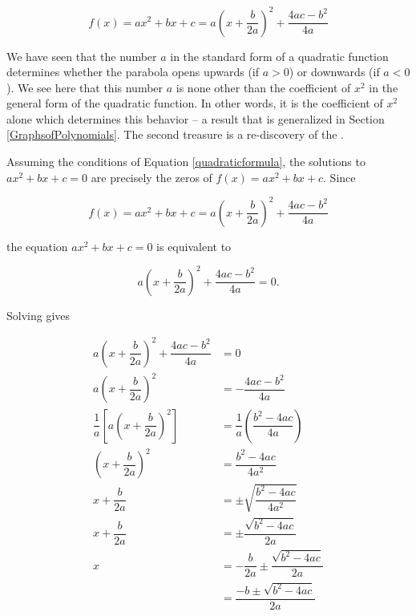 \[ f(x) = ax^2 + bx + c =  a\left(x+\dfrac{b}{2a}\right)^2 + \dfrac{4ac - b^2}{4a}\]


We have seen that the number $a$ in the standard form of a quadratic function determines whether the parabola opens upwards (if $a>0$) or downwards (if $a < 0$).  We see here that this number $a$ is none other than the coefficient of $x^2$ in the general form of the quadratic function.  In other words, it is the coefficient of $x^2$ alone which determines this behavior -- a result that is generalized in Section \ref{GraphsofPolynomials}.  The second treasure is a re-discovery of the  .

\smallskip


\smallskip

Assuming the conditions of Equation \ref{quadraticformula}, the solutions to $ax^2+bx+c = 0$ are precisely the zeros of $f(x) = ax^2 + bx + c$. Since

\[ f(x) = ax^2+bx+c = a\left(x+\dfrac{b}{2a}\right)^2 + \dfrac{4ac - b^2}{4a}\]

the equation $ax^2 + bx + c = 0$ is equivalent to

\[a\left(x+\dfrac{b}{2a}\right)^2 + \dfrac{4ac - b^2}{4a} = 0.\]

Solving gives 

\begin{align*}
 a\left(x+\dfrac{b}{2a}\right)^2 + \dfrac{4ac - b^2}{4a} & =  0  \\ 
  a\left(x+\dfrac{b}{2a}\right)^2  & =  - \dfrac{4ac - b^2}{4a}  \\
  \dfrac{1}{a} \left[a\left(x+\dfrac{b}{2a}\right)^2\right] & =  \dfrac{1}{a} \left(\dfrac{b^2-4ac}{4a}\right)  \\
 \left(x+\dfrac{b}{2a}\right)^2 & =  \dfrac{b^2-4ac}{4a^2} \\ 
  x+\dfrac{b}{2a} & =  \pm \sqrt{\dfrac{b^2-4ac}{4a^2}}  \tag*{extract square roots} \\ 
  x+\dfrac{b}{2a} & =  \pm \dfrac{\sqrt{b^2-4ac}}{2a}  \\
  x & =  -\dfrac{b}{2a} \pm \dfrac{\sqrt{b^2-4ac}}{2a} \\ 
    & =  \dfrac{-b \pm \sqrt{b^2-4ac}}{2a}
\end{align*}

